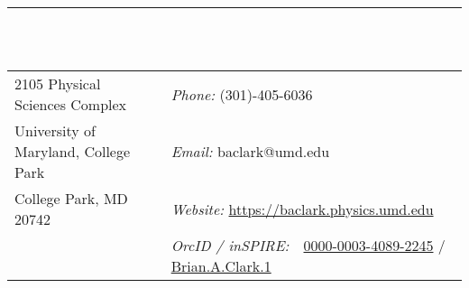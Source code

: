 \documentclass{resume} %
\begin{document}

\vspace{-1cm}
\rule{\textwidth}{0.1cm} \\ \\
\begin{tabular}{@{}p{2.5in}p{4in}}
2105 Physical Sciences Complex            & {\it Phone:}  (301)-405-6036 \\            
University of Maryland, College Park  & {\it Email:}  baclark@umd.edu
 \\         
College Park, MD 20742   & {\it Website:} \url{https://baclark.physics.umd.edu} \\       
   & {\it OrcID / inSPIRE:} \,\,      \href{https://orcid.org/0000-0003-4089-2245}{0000-0003-4089-2245}  / \href{https://inspirehep.net/author/profile/Brian.A.Clark.1}{Brian.A.Clark.1}\\     
\end{tabular}




\end{document}
